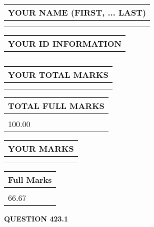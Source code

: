 \documentclass{ctexart}
\begin{document}
   
   
   
\newpage 
\setcounter{page}{ 
   423001 } 
   
   
   
   
\noindent\begin{tabular}{|l|}
\hline
YOUR NAME (FIRST, ... LAST)  \\
\hline
 \\ 
 \\ 
\hline
\end{tabular}
\hspace{0.05in} \begin{tabular}{|l|}
\hline
 YOUR   ID   INFORMATION  \\
\hline
 \\ 
 \\ 
\hline
\end{tabular}
   
   
\vspace{0.2in}\noindent\begin{tabular}{|l|}
\hline
YOUR TOTAL MARKS  \\
\hline
 \\ 
 \\ 
\hline
\end{tabular}
\hspace{0.05in} \begin{tabular}{|l|}
\hline
TOTAL FULL MARKS  \\
\hline
 \\ 
100.00 \\
\hline
\end{tabular}
   
   
 \vspace{0.2in}
 
 
 
 
   
   
  
\vspace{0.2in}
  
\noindent\begin{tabular}{|l|}
\hline
 YOUR MARKS  \\
\hline
 \\ 
 \\ 
\hline
\end{tabular}
\hspace{0.05in} \begin{tabular}{|l|}
\hline
 Full Marks  \\
\hline
 \\ 
66.67 \\
\hline
\end{tabular}
{\textbf{\Large{QUESTION
423.1 
}}}
  
\end{document}

